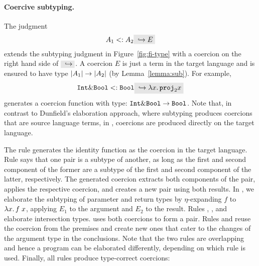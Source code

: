 \paragraph{Coercive subtyping.}

The judgment
\[
A_1 \subtype A_2 \yields E
\]
extends the subtyping judgment in Figure~\ref{fig:fi-type} with a coercion
on the right hand side of $ \yields {} $. A coercion $ E $ is just a term
in the target language and is ensured to have type
$ \im {A_1} \to \im {A_2} $ (by Lemma~\ref{lemma:sub}). For example,
\[
\code{Int} \inter \code{Bool} \subtype \code{Bool} \yields {\lamty x {\im {\code{Int} \inter \code{Bool}}} {\proj 2 x}}
\]
generates a coercion function with type: $\code{Int} \inter \code{Bool} \to \code{Bool}$.
Note that, in contrast to Dunfield's elaboration approach, where subtyping produces
coercions that are source language terms, in \name, coercions are
produced directly on the target language.

The rule  generates the identity function as the coercion in the
target language.
Rule  says that one pair is a subtype of another, as long as 
the first and second component of the former are a subtype of the first and second component
of the latter, respectively.
The generated coercion extracts both components of the pair, applies the respective coercion,
and creates a new pair using both results.
In , we elaborate the subtyping of
parameter and return types by $\eta$-expanding $f$ to $\lamty x {\im {A_3}}
{\app f x}$, applying $E_1$ to the argument and $E_2$ to the result. Rules
, , and
 elaborate intersection types.
 uses both coercions to form a pair. Rules
 and  reuse the coercion
from the premises and create new ones that cater to the changes of the argument
type in the conclusions. Note that the two rules are overlapping and
hence a program can be elaborated differently, depending on which rule
is used. Finally, all rules produce type-correct coercions:



